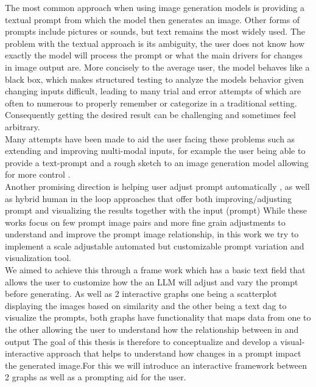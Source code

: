 \documentclass[
  a4paper,  %
  twoside,  %
  bibliography=totoc,
  headsepline,
  cleardoublepage=empty,
  parskip=half,
  draft=false
]{scrbook}
\begin{document}
The most common approach when using image generation models is providing a textual prompt from which the model then generates an image. Other forms of prompts include pictures or sounds, but text remains the most widely used. The problem with the textual  approach is its ambiguity, the user does not know how exactly the model will process the prompt or what the main drivers for changes in image output are. More concisely to the average user, the model behaves like a black box, which makes structured testing to analyze the models behavior given changing inputs difficult, leading to many trial and error attempts of which are often to numerous to properly remember or categorize in a traditional setting. Consequently getting the desired result can be challenging and sometimes feel arbitrary.\\
Many attempts have been made to aid the user facing these problems such as extending and improving multi-modal inputs, for example the user being able to provide a text-prompt and a rough sketch to an image generation model allowing for more control  \cite{lin2025sketchflexfacilitatingspatialsemanticcoherence}. \\Another promising direction is helping user adjust prompt automatically \cite{10.1145/3729176.3729203,You2024Aesthetic},
as well as hybrid human in the loop approaches that offer both improving/adjusting prompt and visualizing the results together with the input (prompt) \cite{PromptMagician,mishra2025promptaidpromptexplorationperturbation,brade2023promptifytexttoimagegenerationinteractive,guo2024prompthisvisualizingprocessinfluence,promptCharm}
While these works focus on few prompt image pairs and more fine grain adjustments to understand and improve the prompt image relationship, in this work we try to implement a scale adjustable automated but customizable prompt variation and visualization tool.\\
We aimed to achieve this through a frame work which has a basic text field that allows the user to customize how the an LLM will adjust and vary the prompt before generating. As well as 2 interactive graphs one being a scatterplot displaying the images based on similarity and the other being a text dag to visualize the prompts, both graphs have functionality that maps data from one to the other allowing the user to understand how the relationship between in and output
The goal of this thesis is therefore to conceptualize and develop a visual-interactive approach that helps to understand how changes in a prompt impact the generated image.For this we will introduce an interactive framework between 2 graphs as well as a prompting aid for the user.\\
\end{document}
